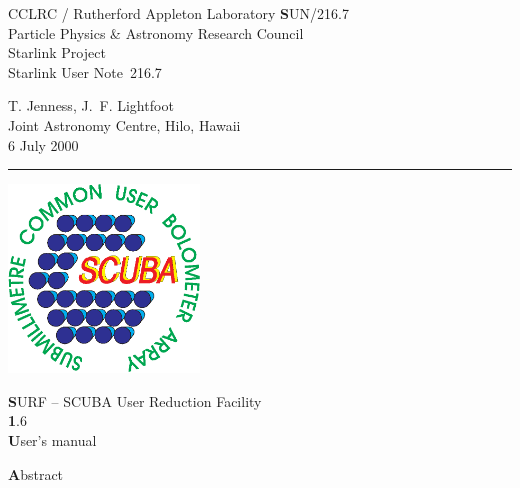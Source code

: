 \documentclass[twoside,11pt]{article}
\newcommand{\stardoccategory}  {Starlink User Note}
\newcommand{\stardocinitials}  {SUN}
\newcommand{\stardocnumber}    {216.7}
\newcommand{\stardocauthors}   {T. Jenness, J.~F. Lightfoot\\
                                Joint Astronomy Centre, Hilo, Hawaii}
\newcommand{\stardocdate}      {6 July 2000}
\newcommand{\stardoctitle}     {SURF -- SCUBA User Reduction Facility}
\newcommand{\stardocversion}   {1.6}
\newcommand{\stardocmanual}    {User's manual}
\newcommand{\stardocname}{\stardocinitials /\stardocnumber}
\newenvironment{latexonly}{}{}
\renewcommand{\_}{\texttt{\symbol{95}}}
\begin{document}
\thispagestyle{empty}



\begin{latexonly}
   CCLRC / {\textsc Rutherford Appleton Laboratory} \hfill {\textbf \stardocname}\\
   {\large Particle Physics \& Astronomy Research Council}\\
   {\large Starlink Project\\}
   {\large \stardoccategory\ \stardocnumber}
   \begin{flushright}
   \stardocauthors\\
   \stardocdate
   \end{flushright}
   \vspace{-4mm}
   \rule{\textwidth}{0.5mm}
   \vspace{5mm}
   \begin{center}
   \includegraphics[width=2.0in]{sun216_logo.eps}

   {\Huge\textbf  \stardoctitle \\ [2.5ex]}
   {\LARGE\textbf \stardocversion \\ [4ex]}
   {\Huge\textbf  \stardocmanual}
   \end{center}
   \vspace{5mm}


   \vspace{10mm}
   \begin{center}
      {\Large\textbf Abstract}
   \end{center}
\end{latexonly}
\end{document}
